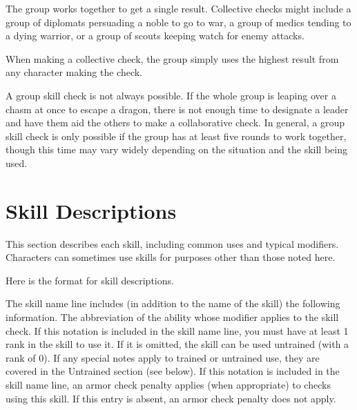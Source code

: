  The group works together to get a single result. Collective checks might include a group of diplomats persuading a noble to go to war, a group of medics tending to a dying warrior, or a group of scouts keeping watch for enemy attacks.

When making a collective check, the group simply uses the highest result from any character making the check.

 A group skill check is not always possible. If the whole group is leaping over a chasm at once to escape a dragon, there is not enough time to designate a leader and have them aid the others to make a collaborative check. In general, a group skill check is only possible if the group has at least five rounds to work together, though this time may vary widely depending on the situation and the skill being used. 



\section{Skill Descriptions}
This section describes each skill, including common uses and typical modifiers. Characters can sometimes use skills for purposes other than those noted here.

Here is the format for skill descriptions.

The skill name line includes (in addition to the name of the skill) the following information.
 The abbreviation of the ability whose modifier applies to the skill check.
 If this notation is included in the skill name line, you must have at least 1 rank in the skill to use it. If it is omitted, the skill can be used untrained (with a rank of 0). If any special notes apply to trained or untrained use, they are covered in the Untrained section (see below).
 If this notation is included in the skill name line, an armor check penalty applies (when appropriate) to checks using this skill. If this entry is absent, an armor check penalty does not apply.

